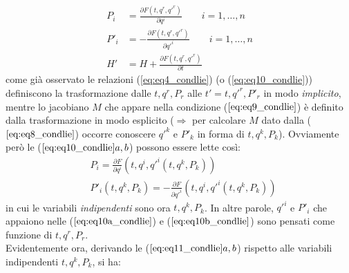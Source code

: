 \begin{subequations} \label{eq:eq10_condlie}
\begin{align}
P_i &= \frac{\partial F (t, q^r, q'^r)}{\partial q^i} \qquad i = 1, \dots , n \label{eq:eq10a_condlie}\\
P'_i &= - \frac{\partial F (t, q^r, q'^r)}{\partial q'^i} \qquad i = 1, \dots , n \label{eq:eq10b_condlie}\\
H' &= H + \frac{\partial F (t, q^r, q'^r)}{\partial t} \label{eq:eq10c_condlie}
\end{align}
\end{subequations}
come già osservato le relazioni (\ref{eq:eq4_condlie}) (o (\ref{eq:eq10_condlie})) definiscono la trasformazione dalle $ t, q^r, P_r $ alle $ t' = t, q'^r, P'_r $ in modo \textit{implicito}, mentre lo jacobiano $ M $ che appare nella condizione ($ \ref{eq:eq9_condlie} $) è definito dalla trasformazione in modo esplicito ($ \Rightarrow $ per calcolare $ M $ dato dalla ($ \ref{eq:eq8_condlie} $) occorre conoscere $ q'^k $ e $ P'_k $ in forma di $ t, q^k, P_k $).
Ovviamente però le ($ \ref{eq:eq10_condlie}a,b $) possono essere lette così:
\begin{subequations} \label{eq:eq11_condlie}
\begin{align}
&P_i = \frac{\partial F}{\partial q^i} \left( t, q^i, q'^i (t, q^k, P_k) \right) \\
&P'_i (t, q^k, P_k) = - \frac{\partial F}{\partial q'^i} \left( t, q^i, q'^i (t, q^k, P_k) \right)
\end{align}
\end{subequations}
in cui le variabili \textit{indipendenti} sono ora $ t, q^k, P_k $. In altre parole, $ q'^i $ e $ P'_i $ che appaiono nelle ($ \ref{eq:eq10a_condlie} $) e ($ \ref{eq:eq10b_condlie} $) sono pensati come funzione di $ t, q^r, P_r $. \\
Evidentemente ora, derivando le ($ \ref{eq:eq11_condlie} a, b $) rispetto alle variabili indipendenti $ t, q^k, P_k $, si ha:

